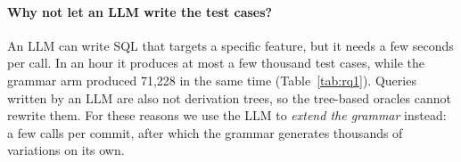 \paragraph{Why not let an LLM write the test cases?} An LLM can write SQL that
targets a specific feature, but it needs a few seconds per call. In an hour it
produces at most a few thousand test cases, while the grammar arm produced
71{,}228 in the same time (Table~\ref{tab:rq1}). Queries written by an LLM are also not
derivation trees, so the tree-based oracles cannot rewrite them. For these
reasons we use the LLM to \emph{extend the grammar} instead: a few calls per
commit, after which the grammar generates thousands of variations on its own.
